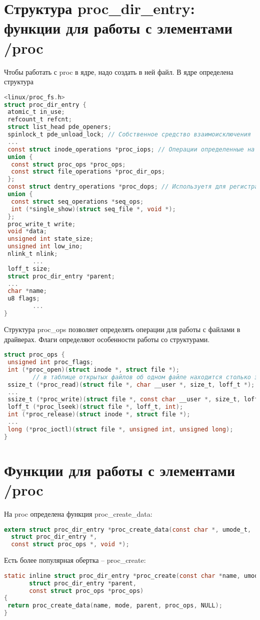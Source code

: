 \section{Структура proc\_dir\_entry: функции для работы с элементами /proc}
Чтобы работать с proc в ядре, надо создать в ней файл.
В ядре определена структура
\begin{lstlisting}[language=C, label=lst:1, caption= Структура proc\_dir\_entry]
<linux/proc_fs.h>
struct proc_dir_entry {
 atomic_t in_use;
 refcount_t refcnt;
 struct list_head pde_openers; 
 spinlock_t pde_unload_lock; // Собственное средство взаимоисключения
 ...
 const struct inode_operations *proc_iops; // Операции определенные на inode фс proc
 union {
  const struct proc_ops *proc_ops;
  const struct file_operations *proc_dir_ops;
 };
 const struct dentry_operations *proc_dops; // Используетя для регистрации своих операций над файлом в proc
 union {
  const struct seq_operations *seq_ops;
  int (*single_show)(struct seq_file *, void *);
 };
 proc_write_t write;
 void *data;
 unsigned int state_size;
 unsigned int low_ino;
 nlink_t nlink;
        ...
 loff_t size;
 struct proc_dir_entry *parent;
 ...
 char *name;
 u8 flags;
        ...
} 
\end{lstlisting}
Структура proc\_ops позволяет определять операции для работы с файлами в драйверах. Флаги определяют особенности работы со структурами.
\begin{lstlisting}[language=C, label=lst:1, caption= Структура proc\_ops]
struct proc_ops {
 unsigned int proc_flags;
 int (*proc_open)(struct inode *, struct file *);
        // в таблице открытых файлов об одном файле находится столько записей, сколько раз он был открыт
 ssize_t (*proc_read)(struct file *, char __user *, size_t, loff_t *);
 ...
 ssize_t (*proc_write)(struct file *, const char __user *, size_t, loff_t *);
 loff_t (*proc_lseek)(struct file *, loff_t, int);
 int (*proc_release)(struct inode *, struct file *);
 ...
 long (*proc_ioctl)(struct file *, unsigned int, unsigned long);
}
\end{lstlisting}

\section{Функции для работы с элементами /proc}

На proc определена функция proc\_create\_data:
\begin{lstlisting}[language=C, label=lst:1, caption= Функция proc\_create\_data]
extern struct proc_dir_entry *proc_create_data(const char *, umode_t,
  struct proc_dir_entry *,
  const struct proc_ops *, void *);
\end{lstlisting}
Есть более популярная обертка -- proc\_create:
\begin{lstlisting}[language=C, label=lst:1, caption= Функция proc\_create]
static inline struct proc_dir_entry *proc_create(const char *name, umode_t mode,
       struct proc_dir_entry *parent,
       const struct proc_ops *proc_ops)
{
 return proc_create_data(name, mode, parent, proc_ops, NULL);
}
\end{lstlisting}

